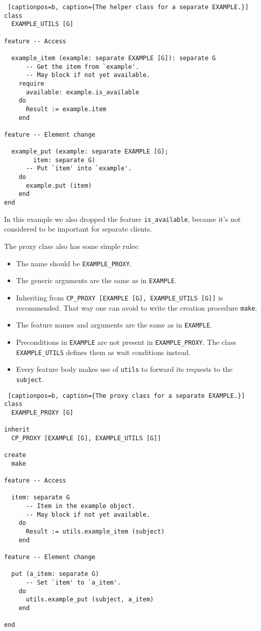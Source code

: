 \begin{lstlisting} [captionpos=b, caption={The helper class for a separate EXAMPLE.}]
class
  EXAMPLE_UTILS [G]
  
feature -- Access

  example_item (example: separate EXAMPLE [G]): separate G
      -- Get the item from `example'.
      -- May block if not yet available.
    require
      available: example.is_available
    do
      Result := example.item
    end

feature -- Element change
 
  example_put (example: separate EXAMPLE [G];
	    item: separate G)
      -- Put `item' into `example'.
    do
      example.put (item)
    end
end
\end{lstlisting}

In this example we also dropped the feature \lstinline!is_available!, because it's not considered to be important for separate clients.

The proxy class also has some simple rules:

 \begin{itemize}
  \item The name should be \lstinline!EXAMPLE_PROXY!.
  \item The generic arguments are the same as in \lstinline!EXAMPLE!.
  \item Inheriting from \lstinline!CP_PROXY [EXAMPLE [G], EXAMPLE_UTILS [G]]! is recommended.
  That way one can avoid to write the creation procedure \lstinline!make!.
  \item The feature names and arguments are the same as in \lstinline!EXAMPLE!.
  \item Preconditions in \lstinline!EXAMPLE! are not present in \lstinline!EXAMPLE_PROXY!. 
  The class \lstinline!EXAMPLE_UTILS! defines them as wait conditions instead.
  \item Every feature body makes use of \lstinline!utils! to forward its requests to the \lstinline!subject!.
 \end{itemize}

\begin{lstlisting} [captionpos=b, caption={The proxy class for a separate EXAMPLE.}]
class
  EXAMPLE_PROXY [G]

inherit
  CP_PROXY [EXAMPLE [G], EXAMPLE_UTILS [G]]

create
  make
  
feature -- Access

  item: separate G
      -- Item in the example object.
      -- May block if not yet available.
    do
      Result := utils.example_item (subject)
    end

feature -- Element change

  put (a_item: separate G)
      -- Set `item' to `a_item'.
    do
      utils.example_put (subject, a_item)
    end

end
\end{lstlisting}
